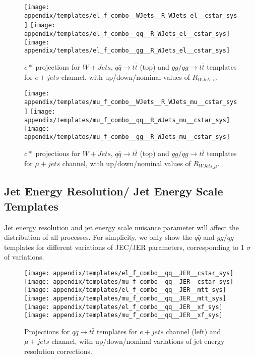 \begin{figure}[hbt]
  \begin{center}
    \texttt{[image: appendix/templates/el\_f\_combo\_\_WJets\_\_R\_WJets\_el\_\_cstar\_sys]}
    \texttt{[image: appendix/templates/el\_f\_combo\_\_qq\_\_R\_WJets\_el\_\_cstar\_sys]}
    \texttt{[image: appendix/templates/el\_f\_combo\_\_gg\_\_R\_WJets\_el\_\_cstar\_sys]}
  \caption{\small $c*$ projections for $W+Jets$,  $q\bar q \rightarrow t\bar t$ (top) and $gg/qg \rightarrow t\bar t$ templates for $e+jets$ channel, with up/down/nominal values of $R_{WJets\_e}$.}
  \label{appendix:R_WJets temp e+jets}
  \end{center}
\end{figure}

\begin{figure}[hbt]
  \begin{center}
    \texttt{[image: appendix/templates/mu\_f\_combo\_\_WJets\_\_R\_WJets\_mu\_\_cstar\_sys]}
    \texttt{[image: appendix/templates/mu\_f\_combo\_\_qq\_\_R\_WJets\_mu\_\_cstar\_sys]}
    \texttt{[image: appendix/templates/mu\_f\_combo\_\_gg\_\_R\_WJets\_mu\_\_cstar\_sys]}
  \caption{\small $c*$ projections for $W+Jets$,  $q\bar q \rightarrow t\bar t$ (top) and $gg/qg \rightarrow t\bar t$ templates for $\mu+jets$ channel, with up/down/nominal values of $R_{WJets\_\mu}$.}
  \label{appendix:R_WJets temp mu+jets}
  \end{center}
\end{figure}

\subsection{Jet Energy Resolution/ Jet Energy Scale Templates}
Jet energy resolution and jet energy scale nuisance parameter will affect the distribution of all processes. For simplicity, we only show the $q\bar q$ and $gg/qg$ templates for different variations of JEC/JER parameters, corresponding to 1 $\sigma$ of variations.

\begin{figure}[hbt]
  \begin{center}
    \texttt{[image: appendix/templates/el\_f\_combo\_\_qq\_\_JER\_\_cstar\_sys]}
    \texttt{[image: appendix/templates/mu\_f\_combo\_\_qq\_\_JER\_\_cstar\_sys]}    
    \texttt{[image: appendix/templates/el\_f\_combo\_\_qq\_\_JER\_\_mtt\_sys]}
    \texttt{[image: appendix/templates/mu\_f\_combo\_\_qq\_\_JER\_\_mtt\_sys]}
    \texttt{[image: appendix/templates/el\_f\_combo\_\_qq\_\_JER\_\_xf\_sys]}
    \texttt{[image: appendix/templates/mu\_f\_combo\_\_qq\_\_JER\_\_xf\_sys]}
  \caption{\small Projections for $q\bar q \rightarrow t\bar t$ templates for $e+jets$ channel (left) and $\mu+jets$ channel, with up/down/nominal variations of jet energy resolution corrections.}
  \label{appendix:JER qq temp}
  \end{center}
\end{figure}


